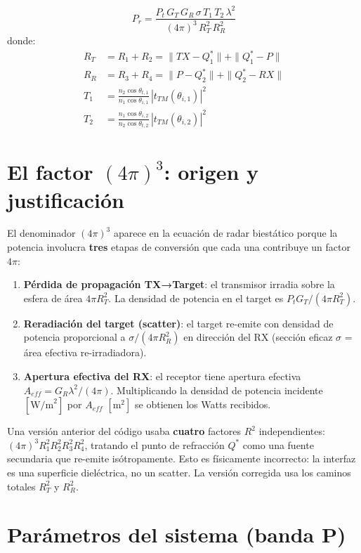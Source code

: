 \documentclass[12pt,a4paper,oneside]{book}
\newcommand{\result}[2]{%
  \begin{tcolorbox}[enhanced, breakable,
    colback=yellow!8, colframe=orange!70!black,
    fonttitle=\bfseries,
    title={\protect#1},
    attach boxed title to top left={yshift=-2mm, xshift=5mm},
    boxed title style={colback=orange!70!black}]
    #2
  \end{tcolorbox}}
\newcommand{\atencion}[2]{%
  \begin{tcolorbox}[enhanced, breakable,
    colback=red!5, colframe=red!60!black,
    fonttitle=\bfseries\small,
    title={\protect#1}]
    #2
  \end{tcolorbox}}
\newcommand{\RT}{R_T}
\newcommand{\RR}{R_R}
\newcommand{\nuno}{n_1}
\newcommand{\ndos}{n_2}
\newcommand{\Prcv}{P_r}
\newcommand{\Pt}{P_t}
\begin{document}
\result{Ecuación de Radar Biestática con Refracción}{
\[
\boxed{\Prcv = \frac{\Pt\,G_T\,G_R\,\sigma\,T_1\,T_2\,\lambda^2}{(4\pi)^3\,\RT^2\,\RR^2}}
\]
donde:
\begin{align*}
\RT &= R_1 + R_2 = \|TX - Q_1^*\| + \|Q_1^* - P\| \\
\RR &= R_3 + R_4 = \|P - Q_2^*\| + \|Q_2^* - RX\|\\
T_1 &= \frac{\ndos\cos\theta_{t,1}}{\nuno\cos\theta_{i,1}}\,|t_{TM}(\theta_{i,1})|^2 \\
T_2 &= \frac{\nuno\cos\theta_{i,2}}{\ndos\cos\theta_{t,2}}\,|t_{TM}(\theta_{i,2})|^2
\end{align*}
}

\section{El factor $(4\pi)^3$: origen y justificación}

El denominador $(4\pi)^3$ aparece en la ecuación de radar biestático porque la potencia involucra \textbf{tres} etapas de conversión que cada una contribuye un factor $4\pi$:

\begin{enumerate}
  \item \textbf{Pérdida de propagación TX→Target}: el transmisor irradia sobre la esfera de área $4\pi\RT^2$. La densidad de potencia en el target es $\Pt G_T / (4\pi\RT^2)$.
  \item \textbf{Reradiación del target (scatter)}: el target re-emite con densidad de potencia proporcional a $\sigma/(4\pi\RR^2)$ en dirección del RX (sección eficaz $\sigma$ = área efectiva re-irradiadora).
  \item \textbf{Apertura efectiva del RX}: el receptor tiene apertura efectiva $A_{eff} = G_R\lambda^2/(4\pi)$. Multiplicando la densidad de potencia incidente $[\text{W/m}^2]$ por $A_{eff}$ $[\text{m}^2]$ se obtienen los Watts recibidos.
\end{enumerate}

\atencion{Error conceptual corregido}{
Una versión anterior del código usaba \textbf{cuatro} factores $R^2$ independientes:
$(4\pi)^3 R_1^2 R_2^2 R_3^2 R_4^2$, tratando el punto de refracción $Q^*$ como una fuente secundaria que re-emite isótropa\-mente. Esto es físicamente incorrecto: la interfaz es una superficie dieléctrica, no un scatter. La versión corregida usa los caminos totales $\RT^2$ y $\RR^2$.
}

\section{Parámetros del sistema (banda P)}
\end{document}
